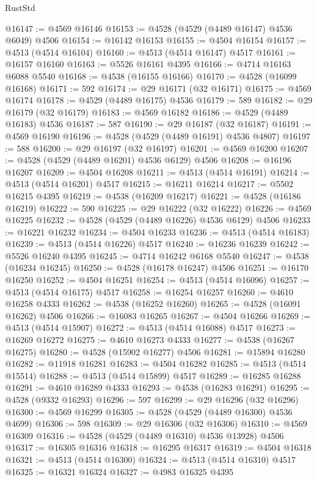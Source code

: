 \begin{lexlean}{RustStd}
\begin{coremodule}
@16147 := @4569 @16146
@16153 := @4528 (@4529 (@4489 @16147) @4536 @6049) @4506
@16154 := @16142 @16153
@16155 := @4504 @16154
@16157 := @4513 (@4514 @16104)
@16160 := @4513 (@4514 @16147) @4517
@16161 := @16157 @16160
@16163 := @5526 @16161 @4395
@16166 := @4714 @16163 @6088 @5540
@16168 := @4538 (@16155 @16166)
@16170 := @4528 (@16099 @16168)
@16171 := 592
@16174 := @29 @16171 (@32 @16171)
@16175 := @4569 @16174
@16178 := @4529 (@4489 @16175) @4536
@16179 := 589
@16182 := @29 @16179 (@32 @16179)
@16183 := @4569 @16182
@16186 := @4529 (@4489 @16183) @4536
@16187 := 587
@16190 := @29 @16187 (@32 @16187)
@16191 := @4569 @16190
@16196 := @4528 (@4529 (@4489 @16191) @4536 @4807)
@16197 := 588
@16200 := @29 @16197 (@32 @16197)
@16201 := @4569 @16200
@16207 := @4528 (@4529 (@4489 @16201) @4536 @6129) @4506
@16208 := @16196 @16207
@16209 := @4504 @16208
@16211 := @4513 (@4514 @16191)
@16214 := @4513 (@4514 @16201) @4517
@16215 := @16211 @16214
@16217 := @5502 @16215 @4395
@16219 := @4538 (@16209 @16217)
@16221 := @4528 (@16186 @16219)
@16222 := 590
@16225 := @29 @16222 (@32 @16222)
@16226 := @4569 @16225
@16232 := @4528 (@4529 (@4489 @16226) @4536 @6129) @4506
@16233 := @16221 @16232
@16234 := @4504 @16233
@16236 := @4513 (@4514 @16183)
@16239 := @4513 (@4514 @16226) @4517
@16240 := @16236 @16239
@16242 := @5526 @16240 @4395
@16245 := @4714 @16242 @6168 @5540
@16247 := @4538 (@16234 @16245)
@16250 := @4528 (@16178 @16247) @4506
@16251 := @16170 @16250
@16252 := @4504 @16251
@16254 := @4513 (@4514 @16096)
@16257 := @4513 (@4514 @16175) @4517
@16258 := @16254 @16257
@16260 := @4610 @16258 @4333
@16262 := @4538 (@16252 @16260)
@16265 := @4528 (@16091 @16262) @4506
@16266 := @16083 @16265
@16267 := @4504 @16266
@16269 := @4513 (@4514 @15907)
@16272 := @4513 (@4514 @16088) @4517
@16273 := @16269 @16272
@16275 := @4610 @16273 @4333
@16277 := @4538 (@16267 @16275)
@16280 := @4528 (@15902 @16277) @4506
@16281 := @15894 @16280
@16282 := @11918 @16281
@16283 := @4504 @16282
@16285 := @4513 (@4514 @15514)
@16288 := @4513 (@4514 @15899) @4517
@16289 := @16285 @16288
@16291 := @4610 @16289 @4333
@16293 := @4538 (@16283 @16291)
@16295 := @4528 (@9332 @16293)
@16296 := 597
@16299 := @29 @16296 (@32 @16296)
@16300 := @4569 @16299
@16305 := @4528 (@4529 (@4489 @16300) @4536 @4699)
@16306 := 598
@16309 := @29 @16306 (@32 @16306)
@16310 := @4569 @16309
@16316 := @4528 (@4529 (@4489 @16310) @4536 @13928) @4506
@16317 := @16305 @16316
@16318 := @16295 @16317
@16319 := @4504 @16318
@16321 := @4513 (@4514 @16300)
@16324 := @4513 (@4514 @16310) @4517
@16325 := @16321 @16324
@16327 := @4983 @16325 @4395

\end{coremodule}
\end{lexlean}
